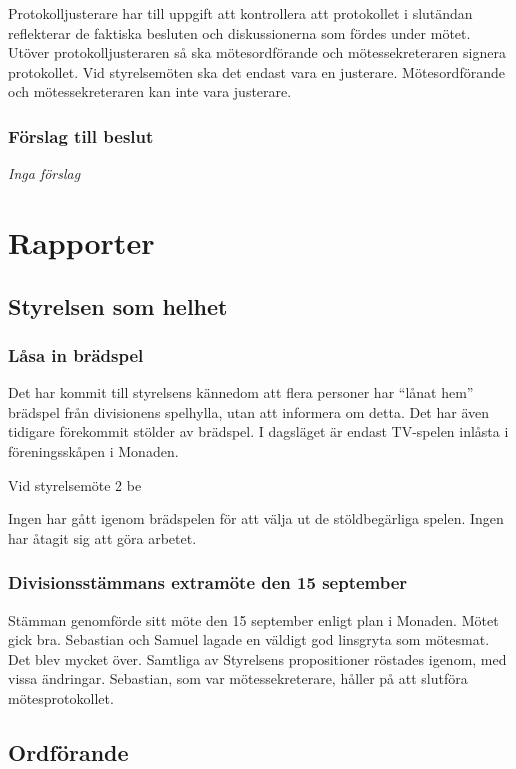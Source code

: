 \documentclass[protokoll]{dvd}
\begin{document}
Protokolljusterare har till uppgift att kontrollera att protokollet i slutändan reflekterar de faktiska besluten och diskussionerna som fördes under mötet.
Utöver protokolljusteraren så ska mötesordförande och mötessekreteraren signera protokollet.
Vid styrelsemöten ska det endast vara en justerare.
Mötesordförande och mötessekreteraren kan inte vara justerare.

\subsubsection*{Förslag till beslut}

\emph{Inga förslag}

\section{Rapporter}

\subsection{Styrelsen som helhet}

\subsubsection{Låsa in brädspel}

Det har kommit till styrelsens kännedom att flera personer har ``lånat hem'' brädspel från divisionens spelhylla, utan att informera om detta.
Det har även tidigare förekommit stölder av brädspel.
I dagsläget är endast TV-spelen inlåsta i föreningsskåpen i Monaden.

Vid styrelsemöte 2 be

Ingen har gått igenom brädspelen för att välja ut de stöldbegärliga spelen.
Ingen har åtagit sig att göra arbetet.

\subsubsection{Divisionsstämmans extramöte den 15 september}

Stämman genomförde sitt möte den 15 september enligt plan i Monaden.
Mötet gick bra.
Sebastian och Samuel lagade en väldigt god linsgryta som mötesmat.
Det blev mycket över.
Samtliga av Styrelsens propositioner röstades igenom, med vissa ändringar.
Sebastian, som var mötessekreterare, håller på att slutföra mötesprotokollet.

\subsection{Ordförande}
\end{document}
